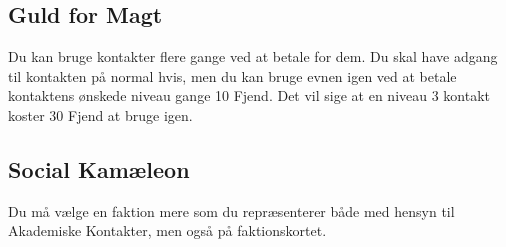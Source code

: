 \subsection*{Guld for Magt}
Du kan bruge kontakter flere gange ved at betale for dem. Du skal have adgang til kontakten på normal hvis, men du kan bruge evnen igen ved at betale kontaktens ønskede niveau gange 10 Fjend. Det vil sige at en niveau 3 kontakt koster 30 Fjend at bruge igen.





\subsection*{Social Kamæleon}
Du må vælge en faktion mere som du repræsenterer både med hensyn til Akademiske Kontakter, men også på faktionskortet. 

